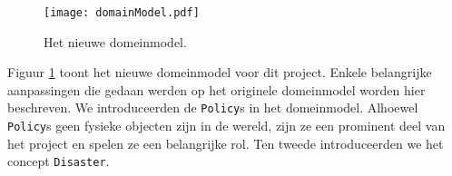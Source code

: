 \label{domeinmodel}
\begin{figure}[htb]
\centering
\texttt{[image: domainModel.pdf]}
\caption{Het nieuwe domeinmodel.}
\label{fig:newDomainModel}
\end{figure}
Figuur \ref{fig:newDomainModel} toont het nieuwe domeinmodel voor dit project. Enkele belangrijke aanpassingen die gedaan werden op het originele domeinmodel worden hier beschreven. We introduceerden de \texttt{Policy}s in het domeinmodel. Alhoewel \texttt{Policy}s geen fysieke objecten zijn in de wereld, zijn ze een prominent deel van het project en spelen ze een belangrijke rol. Ten tweede introduceerden we het concept \texttt{Disaster}.
